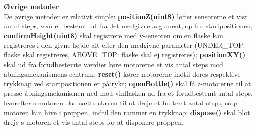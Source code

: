 \textbf{Øvrige metoder} \\
De øvrige metoder er relativt simple: \textbf{positionZ(uint8)} løfter sensorerne et vist antal steps, som er bestemt ud fra det medgivne argument, op fra startpositionen; \textbf{confirmHeight(uint8)} skal registrere med y-sensoren om en flaske kan registreres i den givne højde alt efter den medgivne parameter (UNDER_TOP: flaske skal registreres, ABOVE_TOP: flaske skal ej registreres); \textbf{positionXY()} skal ud fra forudbestemte værdier køre motorerne et vis antal steps mod åbningsmekanismens centrum; \textbf{reset()} kører motorerne indtil deres  respektive trykknap ved startpositionen er påtrykt; \textbf{openBottle()} skal få z-motorerne til at presse åbningsmekanismen ned mod vinflasken ud fra et forudbestemt antal steps, hvorefter s-motoren skal sætte skruen til at dreje et bestemt antal steps, så p-motoren kan hive i proppen, indtil den rammer en trykknap; \textbf{dispose()} skal blot dreje s-motoren et vis antal steps for at disponere proppen.